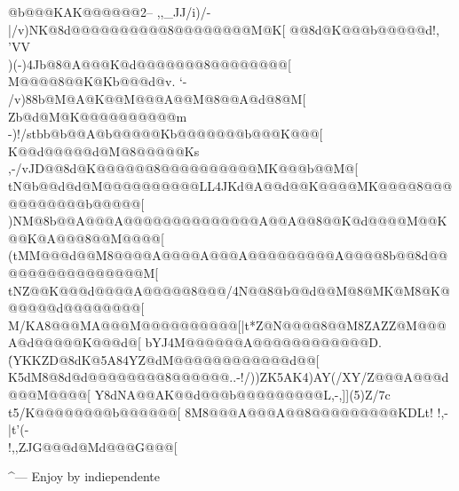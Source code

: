 @b@@@KAK@@@@@@2--    ,,_JJ/i)/- |/v)NK@8d@@@@@@@@@@8@@@@@@@@M@K[
@@8d@K@@@b@@@@@d!,   'VV\)\\)\7(-)4Jb@8@A@@@K@d@@@@@@@8@@@@@@@@[
M@@@@8@@K@Kb@@@d@v.       `-\\/v)88b@M@A@K@@M@@@A@@M@8@@A@d@8@M[
Zb@d@M@K@@@@@@@@@@m       -)!/stbb@b@@A@b@@@@@Kb@@@@@@@b@@@K@@@[
K@@d@@@@@d@M@8@@@@@Ks   ,-/vJD@@8d@K@@@@@@8@@@@@@@@@@MK@@@b@@M@[
tN@b@@d@d@M@@@@@@@@@@LL4JKd@A@@d@@K@@@@MK@@@@8@@@@@@@@@@@b@@@@@[
)NM@8b@@A@@@A@@@@@@@@@@@@@@A@@A@@8@@K@d@@@@M@@K@@K@A@@@8@@M@@@@[
(tMM@@@d@@M8@@@@A@@@@A@@@A@@@@@@@@@A@@@@8b@@8d@@@@@@@@@@@@@@@@M[
tNZ@@K@@@d@@@@A@@@@@8@@@/4N@@8@b@@d@@M@8@MK@M8@K@@@@@@d@@@@@@@@[
M/KA8@@@MA@@@M@@@@@@@@@@[|t*Z@N@@@@8@@M8ZAZZ@M@@@A@d@@@@@K@@@d@[
bYJ4M@@@@@@A@@@@@@@@@@@@D.\'(YKKZD@8dK@5A84YZ@dM@@@@@@@@@@@@d@@[
K5dM8@8d@d@@@@@@@@8@@@@@@..-!/))ZK5AK4)AY(/XY/Z@@@A@@@d@@@M@@@@[
Y8dNA@@AK@@d@@@b@@@@@@@@@L,-,\!]]\X(5)Z/7c\\t5/K@@@@@@@@b@@@@@@[
8M8@@@A@@@A@@8@@@@@@@@@KDLt! !,-|t'(-\\!,\/,\!ZJG@@@d@Md@@@G@@@[

^--- Enjoy by indiependente













































\fi